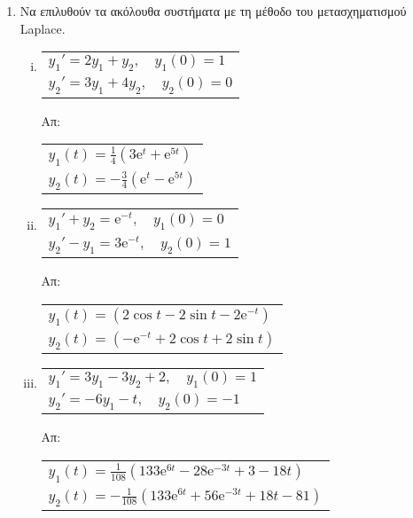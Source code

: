 \begin{enumerate}
    \item Να επιλυθούν τα ακόλουθα συστήματα με τη μέθοδο του μετασχηματισμού Laplace.
      \begin{enumerate}[i)]
        \item \begin{tabular}{l}
            $ y_{1}'=2 y_{1}+ y_{2}, \quad y_{1}(0)=1 $ \\
            $ y_{2}'= 3 y_{1}+ 4 y_{2}, \quad y_{2}(0)= 0 $ 
          \end{tabular} \hfill Απ: 
          \begin{tabular}{l}
            $ y_{1}(t) = \frac{1}{4} \left(3 \mathrm{e}^{t} + \mathrm{e}^{5t}\right) $ \\
            $ y_{2}(t) = -\frac{3}{4} \left( \mathrm{e}^{t} -  \mathrm{e}^{5t}\right) $ 
          \end{tabular}
        \item \begin{tabular}{l}
            $ y_{1}'+ y_{2} = \mathrm{e}^{-t}, \quad y_{1}(0)=0 $ \\
            $ y_{2}' - y_{1} =3\mathrm{e}^{-t}, \quad y_{2}(0)=1 $
          \end{tabular} \hfill Απ: 
          \begin{tabular}{l}
            $ y_{1}(t) = (2 \cos{t} - 2 \sin{t} -2 \mathrm{e}^{-t}) $ \\
            $ y_{2}(t) = ( - \mathrm{e}^{-t} + 2 \cos{t} + 2 \sin{t}) $
          \end{tabular}
        \item \begin{tabular}{l}
            $ y_{1}' = 3 y_{1}- 3 y_{2}+2, \quad y_{1}(0)=1 $ \\
            $ y_{2}' = -6 y_{1} - t, \quad y_{2}(0)=-1 $
          \end{tabular}\hfill \hfill Απ: 
          \begin{tabular}{l}
            $y_{1}(t)=\frac{1}{108}\left(133 \mathrm{e}^{6t} - 28 \mathrm{e}^{-3t} + 3 -18t
            \right)$ \\
            $y_{2}(t)=-\frac{1}{108}\left(133 \mathrm{e}^{6t} + 56 \mathrm{e}^{-3t} + 18t -81
            \right)$ 
          \end{tabular} 
      \end{enumerate}


\end{enumerate}

